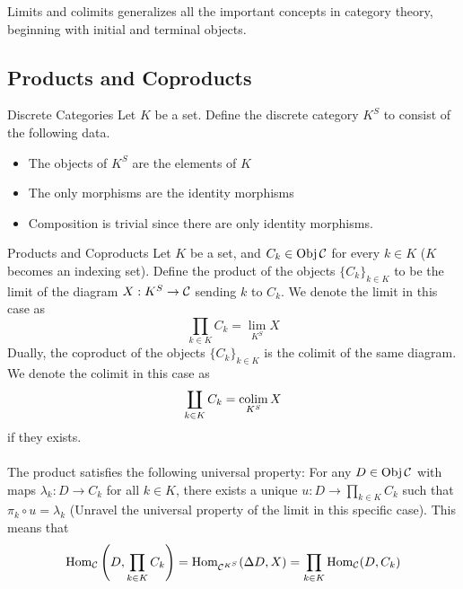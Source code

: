 \documentclass[a4paper]{article}
\begin{document}
Limits and colimits generalizes all the important concepts in category theory, beginning with initial and terminal objects. 

\subsection{Products and Coproducts}
\begin{defn}{Discrete Categories}{} Let $K$ be a set. Define the discrete category $K^S$ to consist of the following data. 
\begin{itemize}
\item The objects of $K^S$ are the elements of $K$
\item The only morphisms are the identity morphisms
\item Composition is trivial since there are only identity morphisms. 
\end{itemize}
\end{defn}

\begin{defn}{Products and Coproducts}{} Let $K$ be a set, and $C_k\in\operatorname{Obj}\mathcal{C}$ for every $k\in K$ ($K$ becomes an indexing set). Define the product of the objects $\{C_k\}_{k\in K}$ to be the limit of the diagram $X:K^S\to\mathcal{C}$ sending $k$ to $C_k$. We denote the limit in this case as $$\prod_{k\in K}C_k=\lim_{K^S}X$$ Dually, the coproduct of the objects $\{C_k\}_{k\in K}$ is the colimit of the same diagram. We denote the colimit in this case as $$\coprod_{k\in K}C_k=\operatorname*{colim}_{K^S}X$$ if they exists. \\~\\
The product satisfies the following universal property: For any $D\in\operatorname{Obj}\mathcal{C}$ with maps $\lambda_k:D\to C_k$ for all $k\in K$, there exists a unique $u:D\to\prod_{k\in K}C_k$ such that $\pi_k\circ u=\lambda_k$ (Unravel the universal property of the limit in this specific case). This means that $$\operatorname{Hom}_{\mathcal{C}}\left(D,\prod_{k\in K}C_k\right)=\operatorname{Hom}_{\mathcal{C}^{K^S}}(\Delta D,X)=\prod_{k\in K}\operatorname{Hom}_{\mathcal{C}}(D, C_k)$$
\end{defn}
\end{document}
